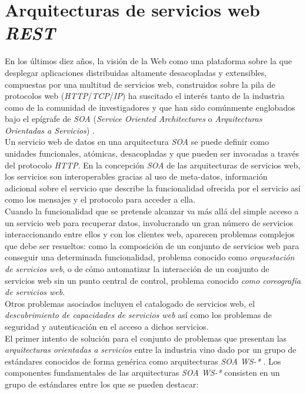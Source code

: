 \section{Arquitecturas de servicios web \textit{REST}}

En los \'ultimos diez a\~nos, la visi\'on de la Web como una plataforma sobre la que desplegar aplicaciones distribuidas altamente desacopladas y extensibles, compuestas por una multitud de servicios web, construidos sobre la pila de protocolos web (\textit{HTTP}/\textit{TCP}/\textit{IP}) ha suscitado el inter\'es tanto de la industria como de la comunidad de investigadores y que han sido com\'unmente englobados bajo el ep\'igrafe de \textit{SOA} (\textit{Service Oriented Architectures} o \textit{Arquitecturas Orientadas a Servicios}) \cite{soa}.\\
Un servicio web de datos en una arquitectura \textit{SOA} se puede definir como unidades funcionales, at\'omicas, desacopladas y que pueden ser invocadas a trav\'es del protocolo \textit{HTTP}. En la concepci\'on \textit{SOA} de las arquitecturas de servicios web, los servicios son interoperables gracias al uso de meta-datos, informaci\'on adicional sobre el servicio que describe la funcionalidad ofrecida por el servicio as\'i como los mensajes y el protocolo para acceder a ella.\\
Cuando la funcionalidad que se pretende alcanzar va m\'as all\'a del simple acceso a un servicio web para recuperar datos, involucrando un gran n\'umero de servicios interaccionando entre ellos y con los clientes web, aparecen problemas complejos que debe ser resueltos: como la composici\'on de un conjunto de servicios web para conseguir una determinada funcionalidad, problema conocido como \textit{orquestaci\'on de servicios web}, o de c\'omo automatizar la interacci\'on de un conjunto de servicios web sin un punto central de control, problema conocido \textit{como coreograf\'ia de servicios web}. \cite{orchestration_choreography}\\
Otros problemas asociados incluyen el catalogado de servicios web, el \textit{descubrimiento de capacidades de servicios web} \cite{hoschek2002web} as\'i como los problemas de seguridad y autenticaci\'on en el acceso a dichos servicios.\\
El primer intento de soluci\'on para el conjunto de problemas que presentan las \textit{arquitecturas orientadas a servicios} entre la industria vino dado por un grupo de est\'andares conocidos de forma gen\'erica como arquitecturas \textit{SOA WS-*} \cite{viering2009lacking}. 
Los componentes fundamentales de las arquitecturas \textit{SOA WS-*} consisten en un grupo de est\'andares entre los que se pueden destacar:\\

